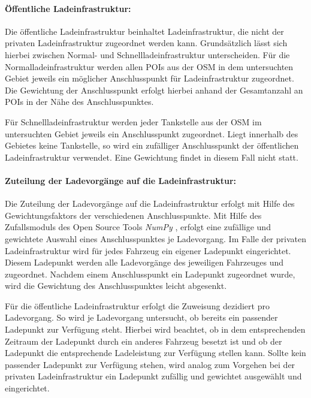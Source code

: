 \paragraph{Öffentliche Ladeinfrastruktur:}

Die öffentliche Ladeinfrastruktur beinhaltet Ladeinfrastruktur, die nicht der privaten Ladeinfrastruktur zugeordnet werden kann.
Grundsätzlich lässt sich hierbei zwischen Normal- und Schnellladeinfrastruktur unterscheiden.
Für die Normalladeinfrastruktur werden allen \glspl{POI} aus der \gls{OSM} \cite{OpenStreetMapFoundation} in dem untersuchten Gebiet jeweils ein möglicher Anschlusspunkt für Ladeinfrastruktur zugeordnet.
Die Gewichtung der Anschlusspunkt erfolgt hierbei anhand der Gesamtanzahl an \glspl{POI} in der Nähe des Anschlusspunktes.\medskip

Für Schnellladeinfrastruktur werden jeder Tankstelle aus der \gls{OSM} \cite{OpenStreetMapFoundation} im untersuchten Gebiet jeweils ein Anschlusspunkt zugeordnet.
Liegt innerhalb des Gebietes keine Tankstelle, so wird ein zufälliger Anschlusspunkt der öffentlichen Ladeinfrastruktur verwendet.
Eine Gewichtung findet in diesem Fall nicht statt.


\paragraph{Zuteilung der Ladevorgänge auf die Ladeinfrastruktur:}

Die Zuteilung der Ladevorgänge auf die Ladeinfrastruktur erfolgt mit Hilfe des Gewichtungsfaktors der verschiedenen Anschlusspunkte.
Mit Hilfe des Zufallsmoduls des Open Source Tools \textit{NumPy} \cite{harris2020array}, erfolgt eine zufällige und gewichtete Auswahl eines Anschlusspunktes je Ladevorgang.
Im Falle der privaten Ladeinfrastruktur wird für jedes Fahrzeug ein eigener Ladepunkt eingerichtet.
Diesem Ladepunkt werden alle Ladevorgänge des jeweiligen Fahrzeuges und \UCs zugeordnet.
Nachdem einem Anschlusspunkt ein Ladepunkt zugeordnet wurde, wird die Gewichtung des Anschlusspunktes leicht abgesenkt.\medskip

Für die öffentliche Ladeinfrastruktur erfolgt die Zuweisung dezidiert pro Ladevorgang.
So wird je Ladevorgang untersucht, ob bereits ein passender Ladepunkt zur Verfügung steht.
Hierbei wird beachtet, ob in dem entsprechenden Zeitraum der Ladepunkt durch ein anderes Fahrzeug besetzt ist und ob der Ladepunkt die entsprechende Ladeleistung zur Verfügung stellen kann.
Sollte kein passender Ladepunkt zur Verfügung stehen, wird analog zum Vorgehen bei der privaten Ladeinfrastruktur ein Ladepunkt zufällig und gewichtet ausgewählt und eingerichtet.\medskip

